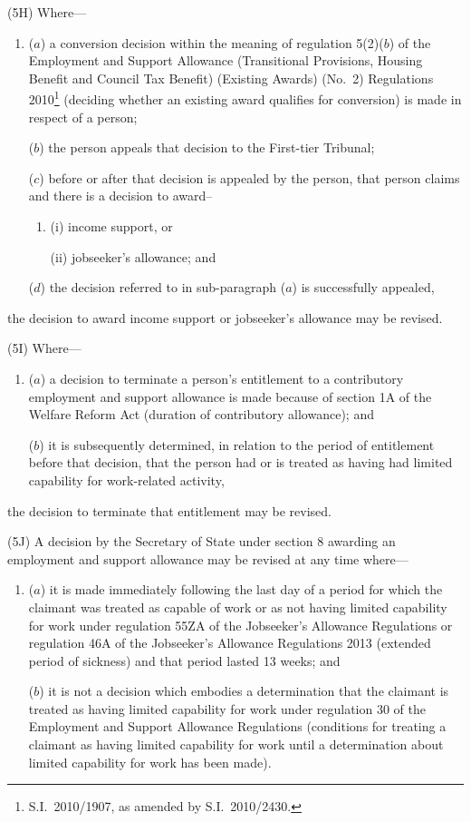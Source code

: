 \documentclass[12pt,a4paper]{article}
\begin{document}
(5H) Where—
\begin{enumerate}\item[]
($a$) a conversion decision within the meaning of regulation 5(2)($b$) of the Employment and Support Allowance (Transitional Provisions, Housing Benefit and Council Tax Benefit) (Existing Awards) (No.~2) Regulations 2010\footnote{S.I.~2010/1907, as amended by S.I.~2010/2430.} (deciding whether an existing award qualifies for conversion) is made in respect of a person;

($b$) the person appeals that decision to the First-tier Tribunal;

($c$) before or after that decision is appealed by the person, that person claims and there is a decision to award–
\begin{enumerate}\item[]
(i) income support, or

(ii) jobseeker’s allowance; and
\end{enumerate}

($d$) the decision referred to in sub-paragraph ($a$) is successfully appealed,
\end{enumerate}
the decision to award income support or jobseeker’s allowance may be revised.

(5I) Where—
\begin{enumerate}\item[]
($a$) a decision to terminate a person’s entitlement to a contributory employment and support allowance is made because of section 1A of the Welfare Reform Act (duration of contributory allowance); and

($b$) it is subsequently determined, in relation to the period of entitlement before that decision, that the person had or is treated as having had limited capability for work-related activity,
\end{enumerate}
the decision to terminate that entitlement may be revised.

(5J) A decision by the Secretary of State under section 8 awarding an employment and support allowance may be revised at any time where—
\begin{enumerate}\item[]
($a$) it is made immediately following the last day of a period for which the claimant was treated as capable of work or as not having limited capability for work under regulation 55ZA of the Jobseeker’s Allowance Regulations or regulation 46A of the Jobseeker’s Allowance Regulations 2013 (extended period of sickness) and that period lasted 13 weeks; and

($b$) it is not a decision which embodies a determination that the claimant is treated as having limited capability for work under regulation 30 of the Employment and Support Allowance Regulations (conditions for treating a claimant as having limited capability for work until a determination about limited capability for work has been made).
\end{enumerate}
\end{document}
